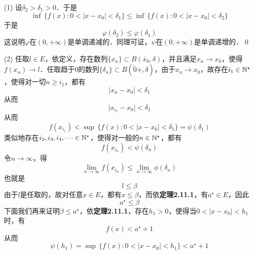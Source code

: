 (1) \prove 设$\delta_2 > \delta_1 > 0$．于是
\begin{equation}
    \inf \, \{ f(x) : 0 < \lvert x - x_0 \rvert < \delta_1 \} \leq \inf \, \{ f(x) : 0 < \lvert x - x_0 \rvert < \delta_2 \}
\end{equation}
于是
\begin{equation*}
    \varphi (\delta_2) \leq \varphi (\delta_1)
\end{equation*}
这说明$\varphi$在$(0, +\infty)$是单调递减的．同理可证，$\psi$在$(0,+\infty)$是单调递增的．\qed\bigskip

(2) \prove 任取$l \in E$，依定义，存在数列$\{ x_n \} \subset B(\check{x_0}, \delta)$，并且满足$x_n \to x_0$，使得$f(x_n) \to l$．任取趋于$0$的数列$\{ \delta_n \} \subset B(\check{0}+, \delta)$，由于$x_n \to x_0$，故存在$i_1 \in \mathbb{N}^\star$，使得对一切$n \geq i_1$，都有
\begin{equation}
    \lvert x_n - x_0 \rvert < \delta_1
\end{equation}
从而
\begin{equation}
    \lvert x_{i_1} - x_0 \lvert < \delta_1
\end{equation}
从而
\begin{equation}
    f(x_{i_1}) < \sup \, \{ f(x) : 0 < \lvert x - x_0 \rvert < \delta_1 \} = \psi (\delta_1)
\end{equation}
类似地存在$i_2, i_3, i_4, \cdots \in \mathbb{N}^\star$，使得对一般的$n \in \mathbb{N}^\star$，都有
\begin{equation}
    f(x_{i_n}) < \psi (\delta_n)
\end{equation}
令$n \to \infty$，得
\begin{equation}
    \lim_{n \to \infty} f(x_{i_n}) \leq \lim_{n \to \infty} \phi (\delta_n)
\end{equation}
也就是
\begin{equation}
    l \leq \beta
\end{equation}
由于$l$是任取的，故对任意$x \in E$，都有$x \leq \beta$，而依\textbf{定理2.11.1}，有$a^\star \in E$，因此
\begin{equation}
    a^\star \leq \beta
\end{equation}
下面我们再来证明$\beta \leq a^\star$，依\textbf{定理2.11.1}，存在$h_1 > 0$，使得当$0 < \lvert x - x_0 \rvert < h_1$时，有
\begin{equation}
    f(x) < a^\star + 1
\end{equation}
从而
\begin{equation}
    \psi (h_1) = \sup \, \{ f(x) : 0 < \lvert x - x_0 \rvert < h_1 \} < a^\star + 1
\end{equation}

